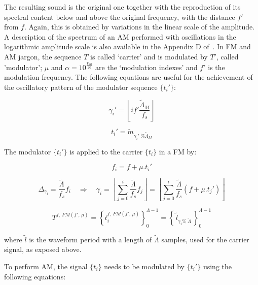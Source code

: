 The resulting sound is the original one together with the
reproduction of its spectral content below and above the original frequency, with the distance $f'$ from $f$.
Again, this is obtained by variations in the linear scale of the amplitude.
A description of the spectrum of an AM performed with oscillations in the logarithmic amplitude scale is also available in the Appendix D of~\cite{dissertacao}.
In FM and AM jargon,
the sequence $T$ is called `carrier' and is modulated by
$T'$, called 'modulator'; $\mu$ and
$\alpha=10^{\frac{V_{dB}}{20}}$ are the `modulation indexes' and $f'$ is the modulation frequency.
The following equations are useful for the achievement of the oscillatory pattern of the modulator sequence $\{t_i'\}$:

\begin{equation}\label{fmGammaAux}
\gamma_i'=\left \lfloor i f' \frac{\widetilde{\Lambda}_M}{f_s} \right \rfloor
\end{equation}

\begin{equation}\label{fmAux}
t_i'=\widetilde{m}_{\gamma_i' \;\% \widetilde{\Lambda}_M}
\end{equation}

The modulator $\{t_i'\}$ is applied to the carrier $\{t_i\}$ in a FM by:

\begin{equation}\label{fmF}
f_i=f + \mu . t_i'
\end{equation}

\begin{equation}\label{fmGamma}
\Delta_{\gamma_i}=\frac{\widetilde{\Lambda}}{f_s}f_i \quad \Rightarrow \quad \gamma_i = \left \lfloor \sum_{j=0}^{i} \frac{\widetilde{\Lambda}}{f_s} f_j \right \rfloor = \left \lfloor \sum_{j=0}^{i} \frac{\widetilde{\Lambda}}{f_s}(f+\mu . t_j') \right\rfloor
\end{equation}

\begin{equation}\label{fmT}
T^{f,\, FM(f',\,\mu)}=\left\{ t_i^{f,\,FM(f',\,\mu)} \right\}_0^{\Lambda-1}=\left\{\,\widetilde{l}_{\gamma_i \%\; \widetilde{\Lambda} } \,\right\}_0^{\Lambda-1}
\end{equation}


\noindent where $\widetilde{l}$ is the waveform period with a length of $\widetilde{\Lambda}$ samples, used for the carrier signal,
	as exposed above.

To perform AM, the signal $\{t_i\}$ needs to be modulated by $\{t_i'\}$ using the following equations:

